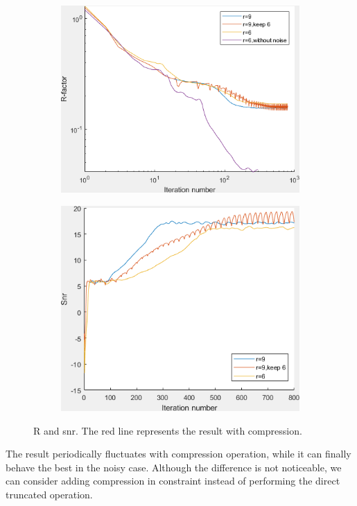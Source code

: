 \documentclass{article}
\numberwithin{equation}{section}
\begin{document}
  \begin{figure}
  \begin{subfigure}{.5\textwidth}
    \centering
    \includegraphics[width=0.9\linewidth]{../figures/noise_R.png}  
    \label{fig:noise_R}
  \end{subfigure}
  \begin{subfigure}{.5\textwidth}
    \centering
    \includegraphics[width=.8\linewidth]{../figures/noise_snr.png}  
    \label{fig:noise_snr}
  \end{subfigure}
  \caption{R and snr. The red line represents the result with compression.}
  \label{fig:noise}
  \end{figure}
 
  The result periodically fluctuates with compression operation, while it can finally behave the best in the noisy case. Although the difference is not noticeable, we can consider adding compression in constraint instead of performing the direct truncated operation.
  
\end{document}

